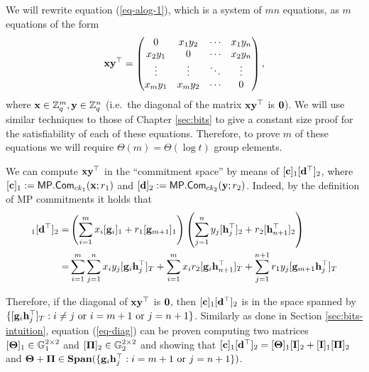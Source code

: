 We will rewrite equation (\ref{eq-alog-1}), which is a system of $m n$ equations, as $m$ equations of the form
\begin{equation}
\mathbf{x}\mathbf{y}^\top=\left(\begin{matrix}
    0      & x_1y_2 & \cdots & x_1y_n\\
    x_2y_1 & 0      & \cdots & x_2y_n\\
    \vdots & \vdots & \ddots & \vdots\\
    x_my_1 & x_my_2 & \cdots & 0\end{matrix}\right),
\label{eq-diag}
\end{equation}
where $\mathbf{x}\in\mathbb{Z}_q^m,\mathbf{y}\in\mathbb{Z}_q^n$ (i.e.~the diagonal of the matrix $\mathbf{x}\mathbf{y}^\top$ is $\mathbf{0}$). We will use similar techniques to those of Chapter \ref{sec:bits} to give a constant size proof for the satisfiability of each of these equations. Therefore, to prove $m$ of these equations we will require $\Theta(m)=\Theta(\log t)$ group elements.

We can compute $\mathbf{x}\mathbf{y}^\top$ in the ``commitment space'' by means of $[\mathbf{c}]_1[\mathbf{d}^\top]_2$, where $[\mathbf{c}]_1:=\mathsf{MP}.\mathsf{Com}_{ck_1}(\mathbf{x};r_1)$ and $[\mathbf{d}]_2:=\mathsf{MP}.\mathsf{Com}_{ck_2}(\mathbf{y};r_2)$. Indeed, by the definition of MP commitments it holds that
\begin{align*}
[\vecb{c}]_1[\vecb{d}^\top]_2
=&\left(\sum_{i=1}^{m}x_i[\vecb{g}_i]_1+r_1[\vecb{g}_{m+1}]_1\right)\left(\sum_{j=1}^{n}y_j[\vecb{h}_j^\top]_2+r_2[\vecb{h}_{n+1}^\top]_2\right)\\
=&\sum_{i=1}^m\sum_{j=1}^n x_iy_j[\vecb{g}_i\vecb{h}_j^\top]_T+\sum_{i=1}^{m}x_ir_2[\vecb{g}_i\vecb{h}_{n+1}^\top]_T+\sum_{j=1}^{n+1}r_1y_j[\vecb{g}_{m+1}\vecb{h}_j^\top]_T
\end{align*}

Therefore, if the diagonal of $\mathbf{x}\mathbf{y}^\top$ is $\mathbf{0}$, then $[\mathbf{c}]_1[\mathbf{d}^\top]_2$ is in the space spanned by $\{[\mathbf{g}_i\mathbf{h}_j^\top]_T:i\neq j \text{ or }i=m+1\text{ or } j=n+1\}$. Similarly as done in Section \ref{sec:bits-intuition}, equation (\ref{eq-diag}) can be proven computing two matrices $[\mathbf{{\Theta}}]_1\in\mathbb{G}_1^{2\times2}$ and $[\mathbf{{\Pi}}]_2\in\mathbb{G}_2^{2\times 2}$ and showing that $[\mathbf{c}]_1[\mathbf{d}^\top]_2=[\mathbf{{\Theta}}]_1[\mathbf{{I}}]_2+[\mathbf{{I}}]_1[\mathbf{{\Pi}}]_2$ and $\mathbf{{\Theta}}+\mathbf{{\Pi}}\in\mathbf{Span}(\{\mathbf{g}_i\mathbf{h}_j^\top:i=m+1\text{ or }j=n+1\})$.

